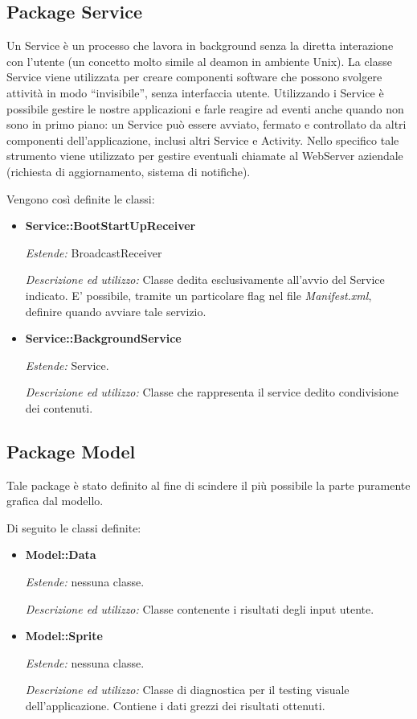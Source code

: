 \subsection{Package Service}

Un Service è un processo che lavora in background senza la diretta interazione con l'utente (un concetto molto simile al deamon in ambiente Unix). La classe Service viene utilizzata per creare componenti software che possono svolgere attività in modo “invisibile”, senza interfaccia utente. Utilizzando i Service è possibile gestire le nostre applicazioni e farle reagire ad eventi anche quando non sono in primo piano: un Service può essere avviato, fermato e controllato da altri componenti dell'applicazione, inclusi altri Service e Activity. Nello specifico tale strumento viene utilizzato per gestire eventuali chiamate al WebServer aziendale (richiesta di aggiornamento, sistema di notifiche).

Vengono così definite le classi:
\begin{itemize}


\item \textbf{Service::BootStartUpReceiver}

\textit{Estende:} BroadcastReceiver

\textit{Descrizione ed utilizzo:} Classe dedita esclusivamente all'avvio del Service indicato. E' possibile, tramite un particolare flag nel file \textit{Manifest.xml}, definire quando avviare tale servizio.

\item \textbf{Service::BackgroundService}

\textit{Estende:} Service. 

\textit{Descrizione ed utilizzo:} Classe che rappresenta il service dedito condivisione dei contenuti.
\end{itemize}

\subsection{Package Model}

Tale package è stato definito al fine di scindere il più possibile la parte puramente grafica dal modello.

Di seguito le classi definite:
\begin{itemize}

\item \textbf{Model::Data}

\textit{Estende:} nessuna classe.

\textit{Descrizione ed utilizzo:} Classe contenente i risultati degli input utente.

\item \textbf{Model::Sprite}

\textit{Estende:} nessuna classe.

\textit{Descrizione ed utilizzo:} Classe di diagnostica per il testing visuale dell'applicazione. Contiene i dati grezzi dei risultati ottenuti.

\end{itemize}
